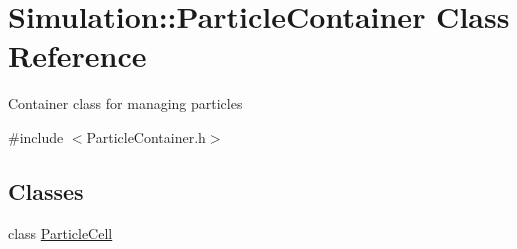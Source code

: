 \hypertarget{classSimulation_1_1ParticleContainer}{\section{Simulation\-:\-:Particle\-Container Class Reference}
\label{classSimulation_1_1ParticleContainer}
}


Container class for managing particles  




{\ttfamily \#include $<$Particle\-Container.\-h$>$}

\subsection*{Classes}
\begin{DoxyCompactItemize}
\item 
class \hyperlink{classSimulation_1_1ParticleContainer_1_1ParticleCell}{Particle\-Cell}
\end{DoxyCompactItemize}
